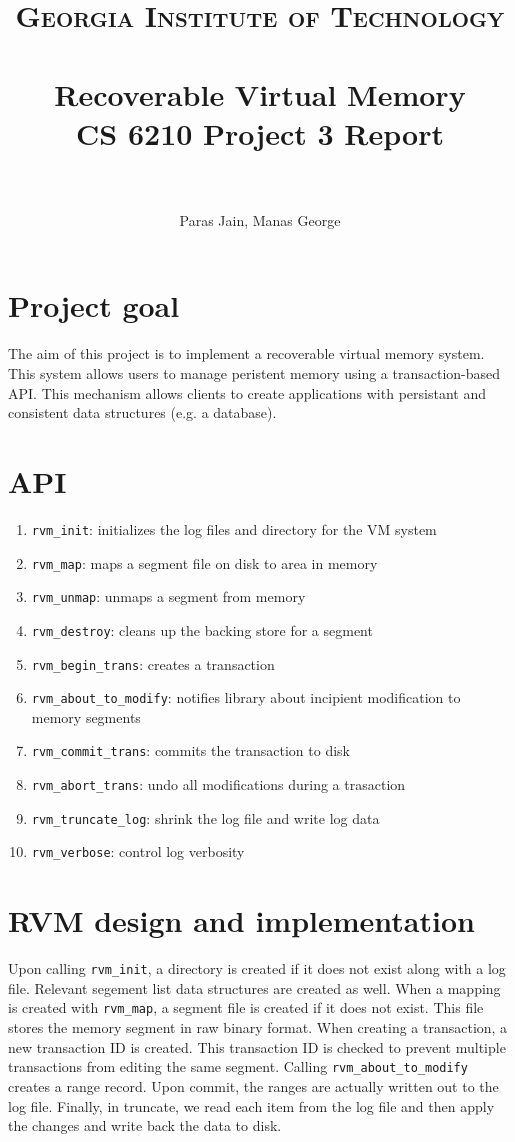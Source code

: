 \documentclass{report} %
\title{	
\normalfont \normalsize 
\textsc{Georgia Institute of Technology} \\ [25pt] %
\horrule{0.5pt} \\[0.4cm] %
\Huge Recoverable Virtual Memory \\ \huge CS 6210 Project 3 Report\\ %
\horrule{2pt} \\[0.5cm] %
}
\author{Paras Jain, Manas George}
\date{}
\numberwithin{equation}{section} %
\numberwithin{figure}{section} %
\numberwithin{table}{section} %
\begin{document}
\maketitle %

\section{Project goal}
The aim of this project is to implement a recoverable virtual memory system. This system allows users to manage peristent memory using a transaction-based API. This mechanism allows clients to create applications with persistant and consistent data structures (e.g. a database).

\section{API}

\begin{enumerate}
  \item \texttt{rvm\_init}: initializes the log files and directory for the VM system
  \item \texttt{rvm\_map}: maps a segment file on disk to area in memory
  \item \texttt{rvm\_unmap}: unmaps a segment from memory
  \item \texttt{rvm\_destroy}: cleans up the backing store for a segment
  \item \texttt{rvm\_begin\_trans}: creates a transaction
  \item \texttt{rvm\_about\_to\_modify}: notifies library about incipient modification to memory segments
  \item \texttt{rvm\_commit\_trans}: commits the transaction to disk
  \item \texttt{rvm\_abort\_trans}: undo all modifications during a trasaction
  \item \texttt{rvm\_truncate\_log}: shrink the log file and write log data
  \item \texttt{rvm\_verbose}: control log verbosity
\end{enumerate}


\section{RVM design and implementation}
Upon calling \texttt{rvm\_init}, a directory is created if it does not exist along with a log file. Relevant segement list data structures are created as well. When a mapping is created with \texttt{rvm\_map}, a segment file is created if it does not exist. This file stores the memory segment in raw binary format. When creating a transaction, a new transaction ID is created. This transaction ID is checked to prevent multiple transactions from editing the same segment. Calling \texttt{rvm\_about\_to\_modify} creates a range record. Upon commit, the ranges are actually written out to the log file. Finally, in truncate, we read each item from the log file and then apply the changes and write back the data to disk.
\end{document}

